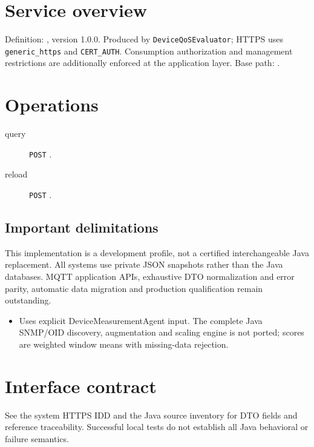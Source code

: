 \documentclass[a4paper]{arrowhead}
\begin{document}
\ArrowheadSetup
\section{Service overview}
Definition: , version 1.0.0. Produced by \texttt{DeviceQoSEvaluator}; HTTPS uses \texttt{generic\_https} and \texttt{CERT\_AUTH}. Consumption authorization and management restrictions are additionally enforced at the application layer. Base path: .
\section{Operations}
\begin{description}
\item[query] \texttt{POST} .
\item[reload] \texttt{POST} .
\end{description}
\subsection{Important delimitations}
This implementation is a development profile, not a certified interchangeable Java replacement. All systems use private JSON snapshots rather than the Java databases. MQTT application APIs, exhaustive DTO normalization and error parity, automatic data migration and production qualification remain outstanding.
\begin{itemize}
\item Uses explicit DeviceMeasurementAgent input. The complete Java SNMP/OID discovery, augmentation and scaling engine is not ported; scores are weighted window means with missing-data rejection.
\end{itemize}
\section{Interface contract}
See the system HTTPS IDD and the Java source inventory for DTO fields and reference traceability. Successful local tests do not establish all Java behavioral or failure semantics.
\end{document}

